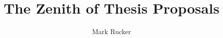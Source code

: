 \documentclass[12pt]{article}
\begin{document}
	
	\title{The Zenith of Thesis Proposals}
	\author{Mark Rucker}
	\maketitle






\end{document}
